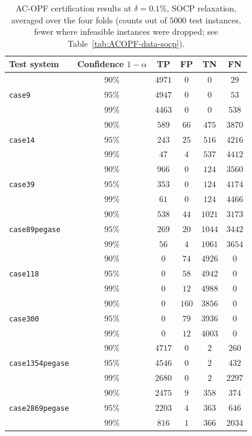 \documentclass[10pt]{article} %
\theoremstyle{plain}
\theoremstyle{definition}
\theoremstyle{remark}
\begin{document}
\begin{table}[H]
\centering
\footnotesize
\caption{AC-OPF certification results at $\delta = 0.1\%$, SOCP relaxation, averaged over the four folds (counts out of $5000$ test instances, fewer where infeasible instances were dropped; see Table~\ref{tab:ACOPF-data-socp}).}
\begin{tabular}{lc cccc}
\toprule
\textbf{Test system} & \textbf{Confidence } $1-\alpha$ & \textbf{TP} & \textbf{FP} & \textbf{TN} & \textbf{FN} \\
\midrule
\multirow{3}{*}{\texttt{case9}} & $90\%$ & $4971$ & $0$ & $0$ & $29$ \\
 & $95\%$ & $4947$ & $0$ & $0$ & $53$ \\
 & $99\%$ & $4463$ & $0$ & $0$ & $538$ \\
\midrule
\multirow{3}{*}{\texttt{case14}} & $90\%$ & $589$ & $66$ & $475$ & $3870$ \\
 & $95\%$ & $243$ & $25$ & $516$ & $4216$ \\
 & $99\%$ & $47$  & $4$  & $537$ & $4412$ \\
\midrule
\multirow{3}{*}{\texttt{case39}} & $90\%$ & $966$ & $0$ & $124$ & $3560$ \\
 & $95\%$ & $353$ & $0$ & $124$ & $4174$ \\
 & $99\%$ & $61$  & $0$ & $124$ & $4466$ \\
\midrule
\multirow{3}{*}{\texttt{case89pegase}} & $90\%$ & $538$ & $44$ & $1021$ & $3173$ \\
 & $95\%$ & $269$ & $20$ & $1044$ & $3442$ \\
 & $99\%$ & $56$  & $4$  & $1061$ & $3654$ \\
\midrule
\multirow{3}{*}{\texttt{case118}} & $90\%$ & $0$ & $74$  & $4926$ & $0$ \\
 & $95\%$ & $0$ & $58$  & $4942$ & $0$ \\
 & $99\%$ & $0$ & $12$  & $4988$ & $0$ \\
\midrule
\multirow{3}{*}{\texttt{case300}} & $90\%$ & $0$ & $160$ & $3856$ & $0$ \\
 & $95\%$ & $0$ & $79$  & $3936$ & $0$ \\
 & $99\%$ & $0$ & $12$  & $4003$ & $0$ \\
\midrule
\multirow{3}{*}{\texttt{case1354pegase}} & $90\%$ & $4717$ & $0$ & $2$ & $260$ \\
 & $95\%$ & $4546$ & $0$ & $2$ & $432$ \\
 & $99\%$ & $2680$ & $0$ & $2$ & $2297$ \\
\midrule
\multirow{3}{*}{\texttt{case2869pegase}} & $90\%$ & $2475$ & $9$ & $358$ & $374$ \\
 & $95\%$ & $2203$ & $4$ & $363$ & $646$ \\
 & $99\%$ & $816$  & $1$ & $366$ & $2034$ \\
\bottomrule
\end{tabular}
\label{tab:ACOPF-cert-socp}
\end{table}
\end{document}
